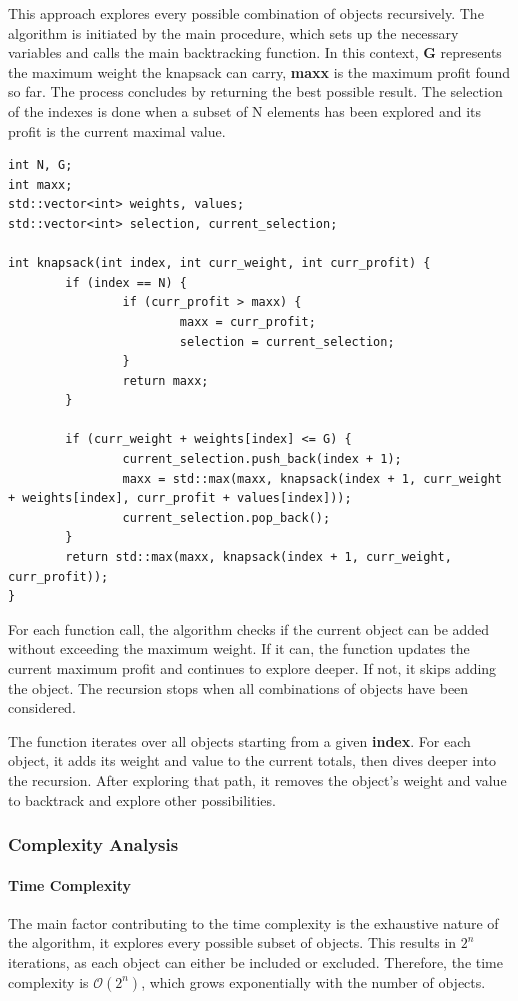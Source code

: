\documentclass{llncs}
\begin{document}
This approach explores every possible combination of objects recursively. The algorithm is initiated
by the main procedure, which sets up the necessary variables and calls the main backtracking
function. In this context, \textbf{G} represents the maximum weight the knapsack can carry, 
\textbf{maxx} is the maximum profit found so far. The process concludes by returning the best 
possible result. The selection of the indexes is done when a subset of N elements has been explored
and its profit is the current maximal value.


\begin{lstlisting}
int N, G;
int maxx;
std::vector<int> weights, values;
std::vector<int> selection, current_selection;

int knapsack(int index, int curr_weight, int curr_profit) {
        if (index == N) {
                if (curr_profit > maxx) {
                        maxx = curr_profit;
                        selection = current_selection;
                }
                return maxx;
        }

        if (curr_weight + weights[index] <= G) {
                current_selection.push_back(index + 1);
                maxx = std::max(maxx, knapsack(index + 1, curr_weight + weights[index], curr_profit + values[index]));
                current_selection.pop_back();
        }
        return std::max(maxx, knapsack(index + 1, curr_weight, curr_profit));
}
\end{lstlisting}

For each function call, the algorithm checks if the current object can be added without exceeding 
the maximum weight. If it can, the function updates the current maximum profit and continues to 
explore deeper. If not, it skips adding the object. The recursion stops when all combinations of
objects have been considered.

The function iterates over all objects starting from a given \textbf{index}. For each object, it 
adds its weight and value to the current totals, then dives deeper into the recursion. After 
exploring that path, it removes the object's weight and value to backtrack and explore other 
possibilities.

\subsubsection{Complexity Analysis}
\paragraph{Time Complexity}
The main factor contributing to the time complexity is the exhaustive nature of the algorithm, it 
explores every possible subset of objects. This results in \( 2^n \) iterations, as each object can 
either be included or excluded. Therefore, the time complexity is $\mathcal{O}(2^n)$, which grows
exponentially with the number of objects.
\end{document}
